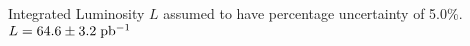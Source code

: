 Integrated Luminosity $L$ assumed to have percentage uncertainty of 5.0\%.\\$L = 64.6 \pm 3.2 \; {\rm pb^{-1}}$\\